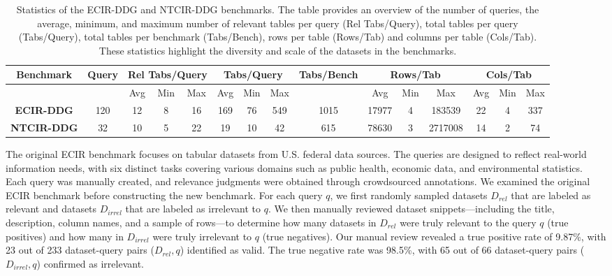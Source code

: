 \begin{table*}
    \centering
    \begin{tabular}{c|c|ccc|ccc|c|ccc|ccc}
        \hline
        \bf Benchmark & \bf Query & \multicolumn{3}{c|}{\bf Rel Tabs/Query} & \multicolumn{3}{c|}{\bf Tabs/Query} & \bf Tabs/Bench & \multicolumn{3}{c|}{\bf Rows/Tab} & \multicolumn{3}{c}{\bf Cols/Tab} \\
        \hline
        & & Avg & Min & Max & Avg & Min & Max & & Avg & Min & Max & Avg & Min & Max \\
        \hline
        \bf ECIR-DDG & 120 & 12 & 8 & 16 & 169 & 76 & 549 & 1015 & 17977 & 4 & 183539 & 22 & 4 & 337 \\
        \bf NTCIR-DDG & 32 & 10 & 5 & 22 & 19 & 10 & 42 & 615 & 78630 & 3 & 2717008 & 14 & 2 & 74\\
        \hline
    \end{tabular}
    \caption{Statistics of the ECIR-DDG and NTCIR-DDG benchmarks. The table provides an overview of the number of queries, the average, minimum, and maximum number of relevant tables per query (Rel Tabs/Query), total tables per query (Tabs/Query), total tables per benchmark (Tabs/Bench), rows per table (Rows/Tab) and columns per table (Cols/Tab). These statistics highlight the diversity and scale of the datasets in the benchmarks.
    }
    \label{tab:benchmark_stats}
    \vspace{-0.77cm}
\end{table*}


The original ECIR benchmark focuses on tabular datasets from U.S. federal data sources. The queries are designed to reflect real-world information needs, with six distinct tasks covering various domains such as public health, economic data, and environmental statistics. Each query was manually created, and relevance judgments were obtained through crowdsourced annotations.
% 
We examined the original ECIR benchmark before constructing the new benchmark. For each query $q$, we first randomly sampled datasets $D_{rel}$ that are labeled as relevant and datasets $D_{irrel}$ that are labeled as irrelevant to $q$. 
% 
We then manually reviewed dataset snippets—including the title, description, column names, and a sample of rows—to determine how many datasets in $D_{rel}$ were truly relevant to the query $q$ (true positives) and how many in $D_{irrel}$ were truly irrelevant to $q$ (true negatives). 
% 
Our manual review revealed a true positive rate of 9.87\%, with 23 out of 233 dataset-query pairs ($D_{rel}, q$) identified as valid. The true negative rate was 98.5\%, with 65 out of 66 dataset-query pairs ($D_{irrel}, q$) confirmed as irrelevant.


